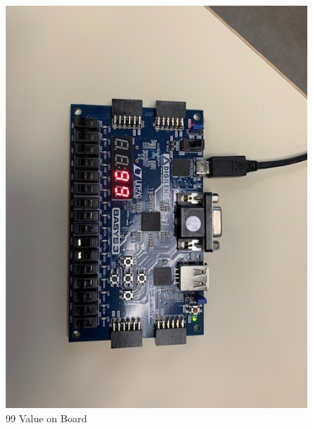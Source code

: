 \documentclass[11pt]{article}
\begin{document}
	\begin{figure}[ht]\centering
		
		
		
		\includegraphics[width=1\textwidth,angle=0,origin=c]{99.jpg}
		\caption{99 Value on Board}
		\label{fig:99_value}
		
	\end{figure}
	
	
\end{document}
